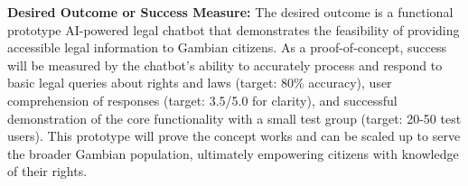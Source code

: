 \documentclass[12pt]{article}
\begin{document}
\textbf{Desired Outcome or Success Measure:} The desired outcome is a functional prototype AI-powered legal chatbot that demonstrates the feasibility of providing accessible legal information to Gambian citizens. As a proof-of-concept, success will be measured by the chatbot's ability to accurately process and respond to basic legal queries about rights and laws (target: 80\% accuracy), user comprehension of responses (target: 3.5/5.0 for clarity), and successful demonstration of the core functionality with a small test group (target: 20-50 test users). This prototype will prove the concept works and can be scaled up to serve the broader Gambian population, ultimately empowering citizens with knowledge of their rights.
\end{document}
